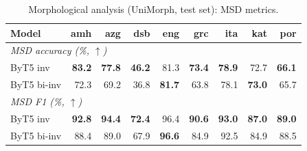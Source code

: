 \begin{table}[h]
\centering
\small
\setlength{\tabcolsep}{5pt}
\renewcommand{\arraystretch}{1.10}
\begin{tabular}{lrrrrrrrr}
\toprule
Model & amh & azg & dsb & eng & grc & ita & kat & por \\
\midrule
\multicolumn{9}{l}{\textit{\acs{MSD} accuracy (\%, $\uparrow$)}} \\
ByT5 inv & \textbf{83.2} & \textbf{77.8} & \textbf{46.2} & 81.3 & \textbf{73.4} & \textbf{78.9} & 72.7 & \textbf{66.1} \\
ByT5 bi-inv & 72.3 & 69.2 & 36.8 & \textbf{81.7} & 63.8 & 78.1 & \textbf{73.0} & 65.7 \\
\midrule
\multicolumn{9}{l}{\textit{\acs{MSD} F1 (\%, $\uparrow$)}} \\
ByT5 inv & \textbf{92.8} & \textbf{94.4} & \textbf{72.4} & 96.4 & \textbf{90.6} & \textbf{93.0} & \textbf{87.0} & \textbf{89.0} \\
ByT5 bi-inv & 88.4 & 89.0 & 67.9 & \textbf{96.6} & 84.9 & 92.5 & 84.9 & 88.5 \\
\bottomrule
\end{tabular}
\caption{Morphological analysis (UniMorph, test set): \acs{MSD} metrics.}
\label{tab:results-analysis-um-msd-matrix}
\end{table}
